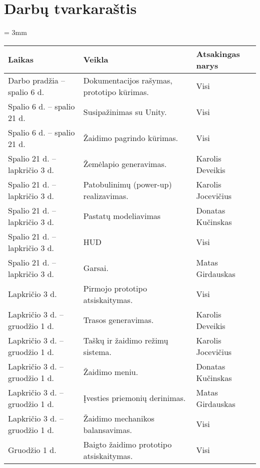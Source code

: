 \section{Darbų tvarkaraštis}

\newcommand{\schedule}[1]{
    \tabulinesep = 3mm
    \taburowcolors{white .. gray!20}
    \begin{longtabu}{ X[c, m] X[c, m] X[c, m] }
        \textbf{Laikas} & \textbf{Veikla} & \textbf{Atsakingas narys} \\
        \endhead
        \tabucline{-}
        #1
    \end{longtabu}
    \tabureset
}

\newcommand{\scheduleEntry}[3]{
    #1 & #2 & #3 \\
}

\schedule{
    \scheduleEntry
    {Darbo pradžia -- spalio 6 d.}
    {Dokumentacijos rašymas, prototipo kūrimas.}
    {Visi}
    \scheduleEntry
    {Spalio 6 d. -- spalio 21 d.}
    {Susipažinimas su Unity.}
    {Visi}
    \scheduleEntry
    {Spalio 6 d. -- spalio 21 d.}
    {Žaidimo pagrindo kūrimas.}
    {Visi}
    \scheduleEntry
    {Spalio 21 d. -- lapkričio 3 d.}
    {Žemėlapio generavimas.}
    {Karolis Deveikis}
    \scheduleEntry
    {Spalio 21 d. -- lapkričio 3 d.}
    {Patobulinimų (power-up) realizavimas.}
    {Karolis Jocevičius}
    \scheduleEntry
    {Spalio 21 d. -- lapkričio 3 d.}
    {Pastatų modeliavimas}
    {Donatas Kučinskas}
    \scheduleEntry
    {Spalio 21 d. -- lapkričio 3 d.}
    {HUD}
    {Visi}
    \scheduleEntry
    {Spalio 21 d. -- lapkričio 3 d.}
    {Garsai.}
    {Matas Girdauskas}
    \scheduleEntry
    {Lapkričio 3 d.}
    {Pirmojo prototipo atsiskaitymas.}
    {Visi}
    \scheduleEntry
    {Lapkričio 3 d. -- gruodžio 1 d.}
    {Trasos generavimas.}
    {Karolis Deveikis}
    \scheduleEntry
    {Lapkričio 3 d. -- gruodžio 1 d.}
    {Taškų ir žaidimo režimų sistema.}
    {Karolis Jocevičius}
    \scheduleEntry
    {Lapkričio 3 d. -- gruodžio 1 d.}
    {Žaidimo meniu.}
    {Donatas Kučinskas}
    \scheduleEntry
    {Lapkričio 3 d. -- gruodžio 1 d.}
    {Įvesties priemonių derinimas.}
    {Matas Girdauskas}
    \scheduleEntry
    {Lapkričio 3 d. -- gruodžio 1 d.}
    {Žaidimo mechanikos balansavimas.}
    {Visi}
    \scheduleEntry
    {Gruodžio 1 d.}
    {Baigto žaidimo prototipo atsiskaitymas.}
    {Visi}
}
